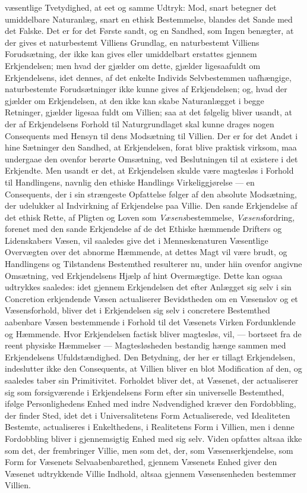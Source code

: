 \documentclass[12pt,a4paper]{book}
\newcommand{\opage}[1]{\marginnote{\footnotesize\textit{[#1]}}}
\begin{document}
væsentlige
Tvetydighed, at eet og samme Udtryk: Mod, snart betegner det
umiddelbare Naturanlæg, snart en ethisk Bestemmelse, blandes det Sande
med det Falske. Det er for det Første sandt, og en Sandhed, som Ingen
benægter, at der gives et naturbestemt Villiens Grundlag, en
naturbestemt Villiens Forudsætning, der ikke kan gives eller umiddelbart
erstattes gjennem Erkjendelsen; men hvad der gjælder om dette, gjælder
ligesaafuldt om Erkjendelsens, idet dennes, af det enkelte Individs
Selvbestemmen uafhængige, naturbestemte Forudsætninger ikke kunne gives
af Erkjendelsen; og, hvad der gjælder om Erkjendelsen, at den ikke kan
skabe Naturanlægget i begge Retninger, gjælder ligesaa fuldt om
Villien; saa at det følgelig bliver usandt, at der af Erkjendelsens
Forhold til Naturgrundlaget skal kunne drages nogen Consequents med
Hensyn til dens Modsætning til Villien. Der er for det Andet i hine
Sætninger den Sandhed, at Erkjendelsen, forat blive praktisk virksom,
maa undergaae den ovenfor berørte Omsætning, ved Beslutningen til at
existere i det Erkjendte. Men usandt er det, at Erkjendelsen skulde
være magtesløs i Forhold til Handlingens, navnlig den ethiske Handlings
Virkeliggjørelse --- en Consequents, der i sin strængeste Opfattelse
følger af den absolute Modsætning, der udelukker \opage{142}al Indvirkning af
Erkjendelse paa Villie. Den sande Erkjendelse af det ethisk Rette, af
Pligten og Loven som \emph{Væsens}bestemmelse, \emph{Væsens}fordring, forenet med den
sande Erkjendelse af de det Ethiske hæmmende Drifters og Lidenskabers
Væsen, vil saaledes give det i Menneskenaturen Væsentlige Overvægten
over det abnorme Hæmmende, at dettes Magt vil være brudt, og
Handlingens og Tilstandens Bestemthed resulterer nu, under hiin ovenfor
angivne Omsætning, ved Erkjendelsens Hjælp af hint Overmægtige. Dette
kan ogsaa udtrykkes saaledes: idet gjennem Erkjendelsen det efter
Anlægget sig selv i sin Concretion erkjendende Væsen actualiserer
Bevidstheden om en Væsenslov og et Væsensforhold, bliver det i
Erkjendelsen sig selv i concretere Bestemthed aabenbare Væsen
bestemmende i Forhold til det Væsenets Virken Fordunklende og
Hæmmende. Hvor Erkjendelsen factisk bliver magtesløs, vil, --- bortseet
fra de reent physiske Hæmmelser --- Magtesløsheden bestandig hænge
sammen med Erkjendelsens Ufuldstændighed. Den Betydning, der her er
tillagt Erkjendelsen, indeslutter ikke den Consequents, at Villien
bliver en blot Modification af den, og saaledes taber sin Primitivitet.
Forholdet bliver det, at Væsenet, der actualiserer sig som forsigværende
i Erkjendelsens Form efter sin universelle Bestemthed, ifølge
Personlighedens Enhed med indre Nødvendighed kræver den Fordobbling,
der finder Sted, idet det i Universalitetens Form Actualiserede, ved
Idealiteten Bestemte, actualiseres i Enkelthedens, i Realitetens Form i
Villien, men i denne Fordobbling bliver i gjennemsigtig Enhed med sig
selv. Viden opfattes altsaa ikke som det, der frembringer Villie, men
som det, der, som Væsenserkjendelse, som Form for Væsenets
Selvaabenbarethed, gjennem Væsenets Enhed giver den Væsenet udtrykkende
Villie Indhold, altsaa gjennem Væsensenheden bestemmer Villien.
\end{document}
